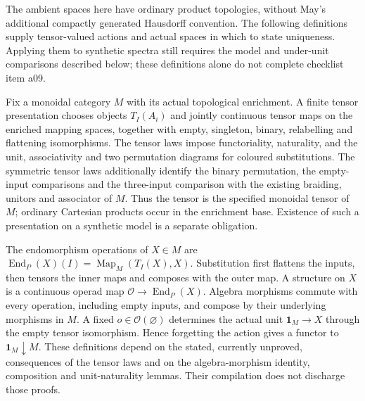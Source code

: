The ambient spaces here have ordinary product topologies, without May's
additional compactly generated Hausdorff convention. The following
definitions supply tensor-valued actions and actual spaces in which to state
uniqueness. Applying them to synthetic spectra still requires the model and
under-unit comparisons described below; these definitions alone do not
complete checklist item a09.

\begin{definition}
  \label{def:enriched-finite-tensor}
  \leanok
  Fix a monoidal category $M$ with its actual topological enrichment.
  A finite tensor presentation chooses objects $T_I(A_i)$ and jointly
  continuous tensor maps on the enriched mapping spaces, together with
  empty, singleton, binary, relabelling and flattening isomorphisms.
  The tensor laws impose functoriality, naturality, and the unit,
  associativity and two permutation diagrams for coloured substitutions.
  The symmetric tensor laws additionally identify the binary permutation,
  the empty-input comparisons and the three-input comparison with the
  existing braiding, unitors and associator of $M$.
  Thus the tensor is the specified monoidal tensor of $M$; ordinary
  Cartesian products occur in the enrichment base. Existence of such a
  presentation on a synthetic model is a separate obligation.
\end{definition}

\begin{definition}
  \label{def:enriched-operadic-algebra}
  The endomorphism operations of $X\in M$ are
  $\operatorname{End}_P(X)(I)=\operatorname{Map}_M(T_I(X),X)$.
  Substitution first flattens the inputs, then tensors the inner maps and
  composes with the outer map. A structure on $X$ is a continuous operad
  map $\mathcal O\to\operatorname{End}_P(X)$.
  Algebra morphisms commute with every operation, including empty inputs,
  and compose by their underlying morphisms in $M$.
  A fixed $o\in\mathcal O(\varnothing)$ determines the actual unit
  $\mathbf1_M\to X$ through the empty tensor isomorphism. Hence forgetting
  the action gives a functor to $\mathbf1_M\downarrow M$.
  These definitions depend on the stated, currently unproved, consequences
  of the tensor laws and on the algebra-morphism identity, composition and
  unit-naturality lemmas. Their compilation does not discharge those proofs.
\end{definition}

